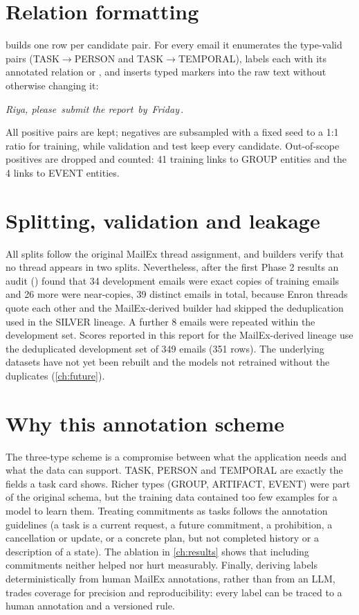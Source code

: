 \section{Relation formatting}
 builds one row per candidate pair. For every email it enumerates the type-valid pairs (TASK$\to$PERSON and TASK$\to$TEMPORAL), labels each with its annotated relation or , and inserts typed markers into the raw text without otherwise changing it:
\begin{center}
\small\emph{Riya, please} \code{[E1\_TASK]}\,\emph{submit the report}\,\code{[/E1\_TASK]} \emph{by} \code{[E2\_TEMPORAL]}\,\emph{Friday}\,\code{[/E2\_TEMPORAL]}.
\end{center}
All positive pairs are kept; negatives are subsampled with a fixed seed to a 1:1 ratio for training, while validation and test keep every candidate. Out-of-scope positives are dropped and counted: 41 training  links to GROUP entities and the 4  links to EVENT entities.

\section{Splitting, validation and leakage}
\label{sec:leakage}
All splits follow the original MailEx thread assignment, and builders verify that no thread appears in two splits. Nevertheless, after the first Phase 2 results an audit () found that 34 development emails were exact copies of training emails and 26 more were near-copies, 39 distinct emails in total, because Enron threads quote each other and the MailEx-derived builder had skipped the deduplication used in the SILVER lineage. A further 8 emails were repeated within the development set. Scores reported in this report for the MailEx-derived lineage use the deduplicated development set of 349 emails (351 rows). The underlying datasets have not yet been rebuilt and the models not retrained without the duplicates (\cref{ch:future}).

\section{Why this annotation scheme}
The three-type scheme is a compromise between what the application needs and what the data can support. TASK, PERSON and TEMPORAL are exactly the fields a task card shows. Richer types (GROUP, ARTIFACT, EVENT) were part of the original schema, but the training data contained too few examples for a model to learn them. Treating commitments as tasks follows the annotation guidelines (a task is a current request, a future commitment, a prohibition, a cancellation or update, or a concrete plan, but not completed history or a description of a state). The ablation in \cref{ch:results} shows that including commitments neither helped nor hurt measurably. Finally, deriving labels deterministically from human MailEx annotations, rather than from an LLM, trades coverage for precision and reproducibility: every label can be traced to a human annotation and a versioned rule.
